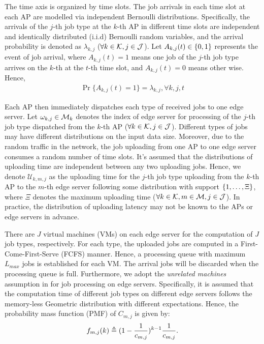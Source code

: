 The time axis is organized by time slots.
The job arrivals in each time slot at each AP are modelled via independent Bernoulli distributions.
Specifically, the arrivals of the $j$-th job type at the $k$-th AP in different time slots are independent and identically distributed (i.i.d) Bernoulli random variables, and the arrival probability is denoted as $\lambda_{k,j}$ ($\forall k\in\mathcal{K}, j\in\mathcal{J}$).
Let $A_{k,j}(t) \in \{0,1\}$ represents the event of job arrival, where $A_{k,j}(t)=1$ means one job of the $j$-th job type arrives on the $k$-th at the $t$-th time slot, and $A_{k,j}(t)=0$ means other wise.
Hence,
\begin{align}
    \Pr\{ A_{k,j}(t) = 1 \} = \lambda_{k,j}, \forall k,j,t
\end{align}

Each AP then immediately dispatches each type of received jobs to one edge server.
Let $\omega_{k,j} \in \mathcal{M}_{k}$ denotes the index of edge server for processing of the $j$-th job type dispatched from the $k$-th AP ($\forall k\in\mathcal{K}, j\in\mathcal{J}$).
Different types of jobs may have different distributions on the input data size.
Moreover, due to the random traffic in the network, the job uploading from one AP to one edge server consumes a random number of time slots.
It's assumed that the distributions of uploading time are independent between any two uploading jobs.
Hence, we denote $\mathcal{U}_{k,m,j}$ as the uploading time for the $j$-th job type uploading from the $k$-th AP to the $m$-th edge server following some distribution with support $\{1, \dots, \Xi\}$, where $\Xi$ denotes the maximum uploading time ($\forall k\in\mathcal{K}, m\in\mathcal{M}, j\in\mathcal{J}$).
In practice, the distribution of uploading latency may not be known to the APs or edge servers in advance.

There are $J$ virtual machines (VMs) on each edge server for the computation of $J$ job types, respectively.
For each type, the uploaded jobs are computed in a First-Come-First-Serve (FCFS) manner.
Hence, a processing queue with maximum $L_{max}$ jobs is established for each VM.
The arrival jobs will be discarded when the processing queue is full.
Furthermore, we adopt the \emph{unrelated machines} assumption in \cite{tan-online} for job processing on edge servers.
Specifically, it is assumed that the computation time of different job types on different edge servers follows the memory-less Geometric distribution with different expectations.
Hence, the probability mass function (PMF) of $C_{m,j}$ is given by:
\begin{align}
    f_{m,j}(k) \triangleq (1-\frac{1}{c_{m,j}})^{k-1} \frac{1}{c_{m,j}}.
\end{align}

